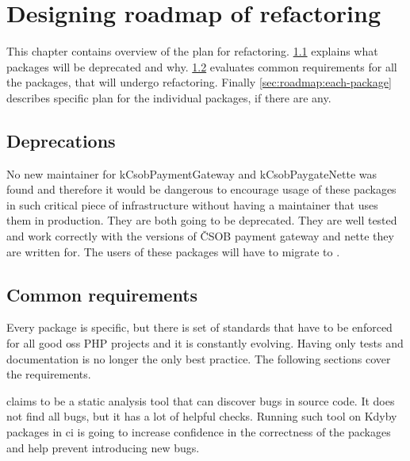 \chapter{Designing roadmap of refactoring}

This chapter contains overview of the plan for refactoring. \ref{sec:roadmap:deprecations} explains what packages will be deprecated and why. \ref{sec:roadmap:common} evaluates common requirements for all the packages, that will undergo refactoring. Finally \ref{sec:roadmap:each-package} describes specific plan for the individual packages, if there are any.

\section{Deprecations} \label{sec:roadmap:deprecations}

No new maintainer for \gls{kCsobPaymentGateway} and \gls{kCsobPaygateNette} was found and therefore it would be dangerous to encourage usage of these packages in such critical piece of infrastructure without having a maintainer that uses them in production. They are both going to be deprecated. They are well tested and work correctly with the versions of ČSOB payment gateway and \gls{nette} they are written for. The users of these packages will have to migrate to .

\section{Common requirements} \label{sec:roadmap:common}

Every package is specific, but there is set of standards that have to be enforced for all good \gls{oss} PHP projects and it is constantly evolving. Having only tests and documentation is no longer the only best practice. The following sections cover the requirements.


 claims to be a static analysis tool that can discover bugs in source code. It does not find all bugs, but it has a lot of helpful checks. Running such tool on Kdyby packages in \gls{ci} is going to increase confidence in the correctness of the packages and help prevent introducing new bugs.

